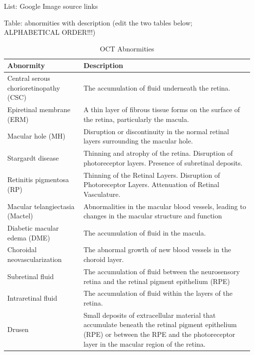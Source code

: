 \documentclass{article}
\begin{document}
	List: Google Image source links
	
	Table: abnormities with description (edit the two tables below; ALPHABETICAL ORDER!!!)
	
	{
		\fontsize{9}{12}\selectfont
		{
			\begin{longtable}{lp{3.8in}}
				\caption{OCT Abnormities}
				\label{tb:oct-abnormites}\\
				\toprule
				Abnormity&Description\\
				\toprule
				
				\multicolumn{1}{l}{Central serous chorioretinopathy (CSC)}
				& \multicolumn{1}{l}{The accumulation of fluid underneath the retina.}\\
				
				\multicolumn{1}{l}{Epiretinal membrane (ERM)}
				& A thin layer of fibrous tissue forms on the surface of the retina, particularly the macula.\\
				
				\multicolumn{1}{l}{Macular hole (MH)}
				& Disruption or discontinuity in the normal retinal layers surrounding the macular hole.\\
				
				\multicolumn{1}{l}{Stargardt disease}
				& Thinning and atrophy of the retina. Disruption of photoreceptor layers. Presence of subretinal deposits.\\
				
				\multicolumn{1}{l}{Retinitis pigmentosa (RP)}
				& Thinning of the Retinal Layers. Disruption of Photoreceptor Layers. Attenuation of Retinal Vasculature.\\
				
				\multicolumn{1}{l}{Macular telangiectasia (Mactel)}
				& Abnormalities in the macular blood vessels, leading to changes in the macular structure and function\\
				
				\multicolumn{1}{l}{Diabetic macular edema (DME)}
				& The accumulation of fluid in the macula. \\
				
				\multicolumn{1}{l}{Choroidal neovascularization}
				& The abnormal growth of new blood vessels in the choroid layer.\\
				
				\multicolumn{1}{l}{Subretinal fluid}
				& The accumulation of fluid between the neurosensory retina and the retinal pigment epithelium (RPE)\\
				
				\multicolumn{1}{l}{Intraretinal fluid}
				& The accumulation of fluid within the layers of the retina.\\
				
				\multicolumn{1}{l}{Drusen}
				& Small deposits of extracellular material that accumulate beneath the retinal pigment epithelium (RPE) or between the RPE and the photoreceptor layer in the macular region of the retina.\\
				
				\bottomrule
			\end{longtable}
		}
	}
	
\end{document}
